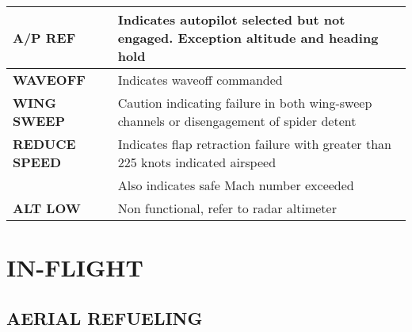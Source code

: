 \documentclass[fontSpartan]{TechCheck}
\begin{document}
\begin{table}[h]
\begin{tabular}{p{2.8cm} | p{9cm}}
			\midrule
			\textbf{A/P REF} & Indicates autopilot selected but not engaged. Exception altitude and heading hold \\
			\midrule
			\textbf{WAVEOFF} & Indicates waveoff commanded \\
			\midrule
			\textbf{WING SWEEP} & Caution indicating failure in both wing-sweep channels or disengagement of spider detent \\
			\midrule
			\textbf{REDUCE SPEED} & Indicates flap retraction failure with greater than 225 knots indicated airspeed \\
			& Also indicates safe Mach number exceeded \\
			\midrule
			\textbf{ALT LOW} & Non functional, refer to radar altimeter \\
			\bottomrule
		\end{tabular}
	\end{table}

	\clearpage

	\section{IN-FLIGHT}
	\subsection{AERIAL REFUELING}
	\begin{tablenumerate}
	\end{tablenumerate}
\end{document}
